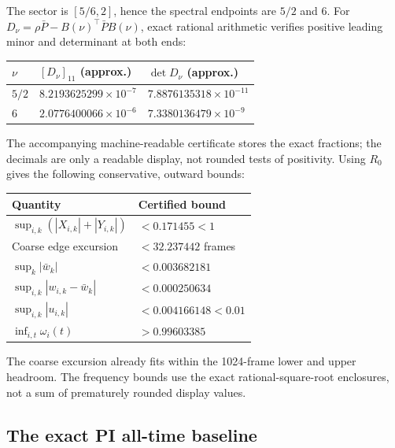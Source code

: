 The sector is $[5/6,2]$, hence the spectral endpoints are $5/2$ and 6.
For $D_\nu=\rho\bar P-B(\nu)^\top\bar P B(\nu)$, exact rational
arithmetic verifies positive leading minor and determinant at both ends:
\begin{center}\small
\begin{tabular}{@{}lll@{}}\toprule
$\nu$ & $[D_\nu]_{11}$ (approx.) & $\det D_\nu$ (approx.)\\\midrule
$5/2$ & $8.2193625299\times10^{-7}$ & $7.8876135318\times10^{-11}$\\
$6$ & $2.0776400066\times10^{-6}$ & $7.3380136479\times10^{-9}$\\
\bottomrule\end{tabular}\end{center}
The accompanying machine-readable certificate stores the exact fractions;
the decimals are only a readable display, not rounded tests of positivity.
Using $R_0$ gives the following conservative, outward bounds:
\begin{center}\small
\begin{tabular}{@{}ll@{}}\toprule
Quantity & Certified bound\\\midrule
$\sup_{i,k}(|X_{i,k}|+|Y_{i,k}|)$ & $<0.171455<1$\\
Coarse edge excursion & $<32.237442$ frames\\
$\sup_k|\bar w_k|$ & $<0.003682181$\\
$\sup_{i,k}|w_{i,k}-\bar w_k|$ & $<0.000250634$\\
$\sup_{i,k}|u_{i,k}|$ & $<0.004166148<0.01$\\
$\inf_{i,t}\omega_i(t)$ & $>0.99603385$\\
\bottomrule\end{tabular}\end{center}
The coarse excursion already fits within the 1024-frame lower and upper
headroom. The frequency bounds use the exact rational-square-root
enclosures, not a sum of prematurely rounded display values.

\subsection{The exact PI all-time baseline}


